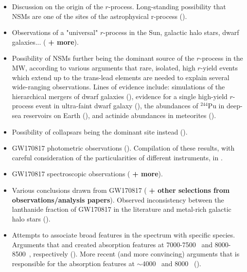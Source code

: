 \documentclass[twocolumn]{aastex63}
\begin{document}
\begin{itemize}
    \item Discussion on the origin of the $r$-process. Long-standing possibility that NSMs are one of the sites of the astrophysical r-process (\citealt{lattimer74, eichler89, freiburghaus99}). 

    \item Observations of a "universal" $r$-process in the Sun, galactic halo stars, dwarf galaxies... (\citealt{sneden08, ji16, cote18} \textbf{+ more}).
    
    \item Possibility of NSMs further being the dominant source of the $r$-process in the MW, according to various arguments that rare, isolated, high $r$-yield events which extend up to the trans-lead elements are needed to explain several wide-ranging observations. Lines of evidence include: simulations of the hierarchical mergers of dwarf galaxies (\citealt{ishimaru15}), evidence for a single high-yield $r$-process event in ultra-faint dwarf galaxy  (\citealt{ji16, roederer16}), the abundances of $^{244}$Pu in deep-sea reservoirs on Earth (\citealt{wallner15}), and actinide abundances in meteorites (\citealt{bartos19}).
    
    
    \item Possibility of collapsars being the dominant site instead (\citealt{siegel19}).
    
    
    \item GW170817 photometric observations (\citealt{andreoni17, arcavi17, coulter17, diaz17, drout17, evans17, hu17, kasliwal17, lipunov17, shappee17, tanvir17, troja17, utsumi17, valenti17}). Compilation of these results, with careful consideration of the particularities of different instruments, in \cite{villar17}.
    
    \item GW170817 spectroscopic observations (\citealt{chornock17, kasen17, pian17, smartt17, cote18} \textbf{+ more}). 
    
    
    \item Various conclusions drawn from GW170817 (\citealt{kasen17, smartt17, cote18, rosswog18} \textbf{+ other selections from observations/analysis papers}). Observed inconsistency between the lanthanide fraction of GW170817 in the literature and metal-rich galactic halo stars (\citealt{ji19}).

    
    \item Attempts to associate broad features in the spectrum with specific species. Arguments that  and  created absorption features at 7000-7500~\text{\AA} and 8000-8500~\text{\AA}, respectively (\citealt{smartt17}). More recent (and more convincing) arguments that  is responsible for the absorption features at $\sim$4000~\text{\AA} and 8000~\text{\AA} (\citealt{watson19}).
    

\end{itemize}
\end{document}
